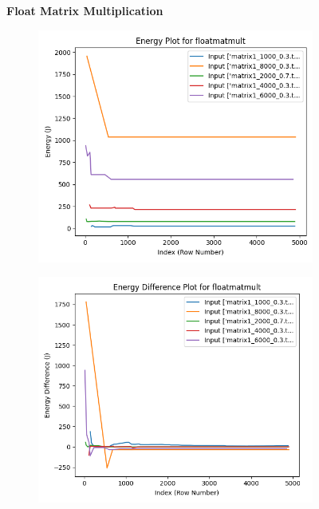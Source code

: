\documentclass[times, 10pt,twocolumn]{article}
\begin{document}
\begin{figure}[ht]
   \centering
   \textbf{Float Matrix Multiplication}\par\medskip
   \begin{subfigure}[b]{0.3\textwidth}
     \includegraphics[width=\textwidth]{imgs/final_experiment_plots/model_analysis/measurement_data_analysis/matmult_energy.png}
     \caption{}
     \label{fig:matmultenergy}
   \end{subfigure}
   \hfill
   \begin{subfigure}[b]{0.3\textwidth}
      \includegraphics[width=\textwidth]{imgs/final_experiment_plots/model_analysis/measurement_data_analysis/matmult_energy_diff.png}

\end{subfigure}
\end{figure}
\end{document}

